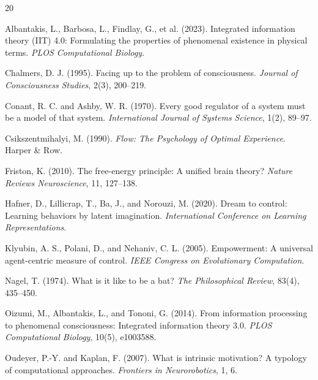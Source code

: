 \documentclass[11pt]{article}
\begin{document}
\newpage

\begin{thebibliography}{20}

Albantakis, L., Barbosa, L., Findlay, G., et al. (2023).
\newblock Integrated information theory (IIT) 4.0: Formulating the properties of phenomenal existence in physical terms.
\newblock \emph{PLOS Computational Biology}.

Chalmers, D. J. (1995).
\newblock Facing up to the problem of consciousness.
\newblock \emph{Journal of Consciousness Studies}, 2(3), 200--219.

Conant, R. C. and Ashby, W. R. (1970).
\newblock Every good regulator of a system must be a model of that system.
\newblock \emph{International Journal of Systems Science}, 1(2), 89--97.

Csikszentmihalyi, M. (1990).
\newblock \emph{Flow: The Psychology of Optimal Experience}.
\newblock Harper \& Row.

Friston, K. (2010).
\newblock The free-energy principle: A unified brain theory?
\newblock \emph{Nature Reviews Neuroscience}, 11, 127--138.

Hafner, D., Lillicrap, T., Ba, J., and Norouzi, M. (2020).
\newblock Dream to control: Learning behaviors by latent imagination.
\newblock \emph{International Conference on Learning Representations}.

Klyubin, A. S., Polani, D., and Nehaniv, C. L. (2005).
\newblock Empowerment: A universal agent-centric measure of control.
\newblock \emph{IEEE Congress on Evolutionary Computation}.

Nagel, T. (1974).
\newblock What is it like to be a bat?
\newblock \emph{The Philosophical Review}, 83(4), 435--450.

Oizumi, M., Albantakis, L., and Tononi, G. (2014).
\newblock From information processing to phenomenal consciousness: Integrated information theory 3.0.
\newblock \emph{PLOS Computational Biology}, 10(5), e1003588.

Oudeyer, P.-Y. and Kaplan, F. (2007).
\newblock What is intrinsic motivation? A typology of computational approaches.
\newblock \emph{Frontiers in Neurorobotics}, 1, 6.


\end{thebibliography}
\end{document}
